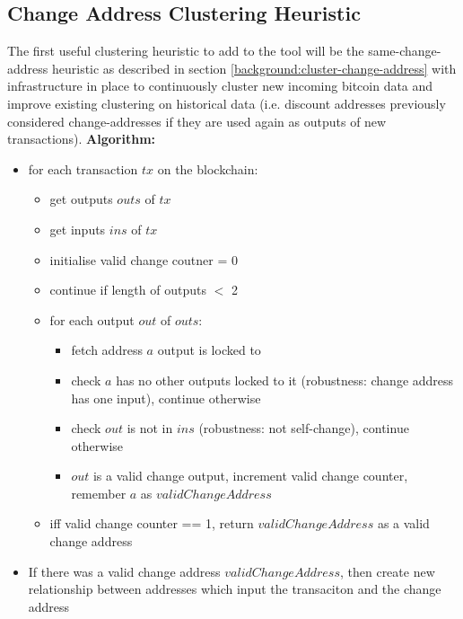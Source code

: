 \subsection{Change Address Clustering Heuristic}\label{conclusion:change-address-clustering}
The first useful clustering heuristic to add to the tool will be the same-change-address heuristic as described in section \ref{background:cluster-change-address} with infrastructure in place to continuously cluster new incoming bitcoin data and improve existing clustering on historical data (i.e. discount addresses previously considered change-addresses if they are used again as outputs of new transactions).
\textbf{Algorithm:}
\begin{itemize}
    \item for each transaction $tx$ on the blockchain:
    \begin{itemize}
        \item get outputs $outs$ of $tx$
        \item get inputs $ins$ of $tx$
        \item initialise valid change coutner = 0
        \item continue if length of outputs $<$ 2 
        \item for each output $out$ of $outs$:
        \begin{itemize}
            \item fetch address $a$ output is locked to 
            \item check $a$ has no other outputs locked to it (robustness: change address has one input), continue otherwise
            \item check $out$ is not in $ins$ (robustness: not self-change), continue otherwise
            \item $out$ is a valid change output, increment valid change counter, remember $a$ as $validChangeAddress$
        \end{itemize}
        \item iff valid change counter == 1, return $validChangeAddress$ as a valid change address
    \end{itemize}
    \item If there was a valid change address $validChangeAddress$, then create new relationship between addresses which input the transaciton and the change address
\end{itemize}

